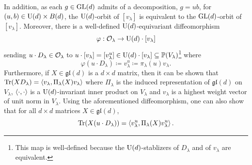 \documentclass[notitlepage, 10pt]{article}
\begin{document}
In addition, as each $g \in \operatorname{GL}(d)$ admits of a decomposition, $g = ub$, for $(u,b) \in \operatorname{U}(d) \times B(d)$, the $\operatorname{U}(d)$-orbit of $[v_{\lambda}]$ is equivalent to the $\operatorname{GL}(d)$-orbit of $[v_{\lambda}]$.
Moreover, there is a well-defined $\operatorname{U}(d)$-equivariant diffeomorphism
\begin{equation}
    \varphi : \mathcal O_{\lambda} \to \operatorname{U}(d) \cdot [v_{\lambda}]
\end{equation}
sending $u\cdot D_{\lambda} \in \mathcal O_{\lambda}$ to $u \cdot [v_{\lambda}] = [v_{\lambda}^{u}] \in \operatorname{U}(d)\cdot [v_{\lambda}] \subseteq \operatorname{\mathbb P}(V_{\lambda})$\footnote{This map is well-defined because the $\operatorname{U}(d)$-stablizers of $D_{\lambda}$ and of $v_{\lambda}$ are equivalent.} where 
\begin{equation}
    \varphi(u \cdot D_{\lambda}) \coloneqq v_{\lambda}^{u} \coloneqq \pi_{\lambda}(u) v_{\lambda}.
\end{equation}
Furthermore, if $X \in \mathfrak{gl}(d)$ is a $d\times d$ matrix, then it can be shown that $\operatorname{Tr}(X D_{\lambda}) = \braket{v_{\lambda}, \Pi_{\lambda}(X) v_{\lambda}}$ where $\Pi_{\lambda}$ is the induced representation of $\mathfrak{gl}(d)$ on $V_{\lambda}$, $\braket{\cdot,\cdot}$ is a $\operatorname{U}(d)$-invariant inner product on $V_{\lambda}$ and $v_{\lambda}$ is a highest weight vector of unit norm in $V_{\lambda}$.
Using the aforementioned diffeomorphism, one can also show that for all $d\times d$ matrices $X \in \mathfrak{gl}(d)$,
\begin{equation}
    \operatorname{Tr}(X (u\cdot D_{\lambda})) = \braket{v_{\lambda}^{u}, \Pi_{\lambda}(X) v_{\lambda}^{u}}.
\end{equation}
\end{document}
